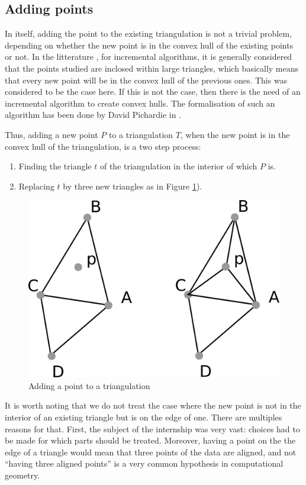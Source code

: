 \documentclass[a4paper,10pt]{article}
\begin{document}
\subsection{Adding points}

In itself, adding the point to the existing triangulation is not a trivial problem, depending on whether the new point is in the convex hull of the existing points or not. In the litterature \cite{Del}, for incremental algorithms, it is generally considered that the points studied are inclosed within large triangles, which basically means that every new point will be in the convex hull of the previous ones. This was considered to be the case here. If this is not the case, then there is the need of an incremental algorithm to create convex hulls. The formalisation of such an algorithm has been done by David Pichardie in \cite{Hull}.

Thus, adding a new point $P$ to a triangulation $T$, when the new point is in the convex hull of the triangulation, is a two step process:
\begin{enumerate}
\item Finding the triangle $t$ of the triangulation in the interior of which $P$ is.
\item Replacing $t$ by three new triangles as in Figure \ref{adding}).
\end{enumerate}
\begin{figure}
\centering
\includegraphics[scale=2]{adding}
\caption{\label{adding} Adding a point to a triangulation}
\end{figure}

It is worth noting that we do not treat the case where the new point is not in the interior of an existing triangle but is on the edge of one. There are multiples reasons for that. First, the subject of the internship was very vast: choices had to be made for which parts should be treated. Moreover, having a point on the the edge of a triangle would mean that three points of the data are aligned, and not ``having three aligned points'' is a very common hypothesis in computational geometry. 
\end{document}
